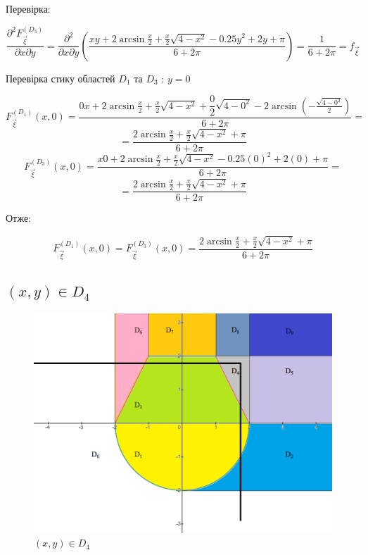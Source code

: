 \documentclass[14pt, a4paper, ukrainian]{extreport}
\begin{document}
	Перевірка:
	
	$$\frac{\partial^2F_{\vec\xi}^{\left(D_3\right)}}{\partial x \partial y} = \frac{\partial^2}{\partial x \partial y}\left(\frac{xy + 2\arcsin\frac{x}{2} + \frac{x}{2}\sqrt{4-x^2} - 0.25y^2 + 2y + \pi}{6+2\pi}\right) = \frac{1}{6+2\pi} = f_{\vec\xi}
	$$
	
	Перевірка стику областей $D_1$ та $D_3$ : $ y =0$
	
	$$ F_{\vec\xi}^{\left({D_1}\right)}(x, 0) = \dfrac{0x + 2\arcsin\frac{x}{2} + \frac{x}{2}\sqrt{4-x^2} + \dfrac{0}{2}\sqrt{4-0^2} - 2\arcsin{\left(-\frac{\sqrt{4-0^2}}{2}\right)}}{6+2\pi} = 
	$$
	$$ = \dfrac{2\arcsin\frac{x}{2} + \frac{x}{2}\sqrt{4-x^2} + \pi}{6+2\pi}
	$$
	$$ F_{\vec\xi}^{\left({D_3}\right)}(x, 0) = \frac{x0 + 2\arcsin\frac{x}{2} + \frac{x}{2}\sqrt{4-x^2} - 0.25(0)^2 + 2(0) + \pi}{6+2\pi} = 
	$$
	$$ = \dfrac{2\arcsin\frac{x}{2} + \frac{x}{2}\sqrt{4-x^2} + \pi}{6+2\pi}
	$$
	
	Отже:
	
	$$  F_{\vec\xi}^{\left({D_1}\right)}(x, 0) =  F_{\vec\xi}^{\left({D_3}\right)}(x, 0) = \dfrac{2\arcsin\frac{x}{2} + \frac{x}{2}\sqrt{4-x^2} + \pi}{6+2\pi}
	$$
		
	\subsection{$(x, y) \in D_4 $}
	
	\begin{figure}[H]
		\centering
		\includegraphics[width=\textwidth]{./Image/Im_15_D_4.png}
		\caption{$(x, y) \in D_4 $}
		\label{im:D_4}
	\end{figure}
	
\end{document}
